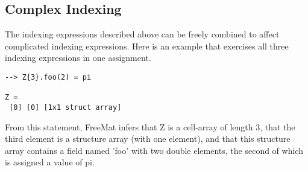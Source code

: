 \subsection{Complex Indexing}

The indexing expressions described above can be freely combined
to affect complicated indexing expressions.  Here is an example
that exercises all three indexing expressions in one assignment.
\begin{verbatim}
--> Z{3}.foo(2) = pi

Z = 
 [0] [0] [1x1 struct array] 
\end{verbatim}
From this statement, FreeMat infers that Z is a cell-array of
length 3, that the third element is a structure array (with one
element), and that this structure array contains a field named
'foo' with two double elements, the second of which is assigned
a value of pi.
